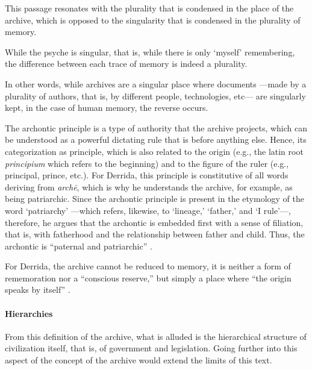 This passage resonates with the plurality that is condensed in the place of the archive, which is opposed to the singularity that is condensed in the plurality of memory. 

While the psyche is singular, that is, while there is only `myself' remembering, the difference between each trace of memory is indeed a plurality. 


In other words, while archives are a singular place where documents ---made by a plurality of authors, that is, by different people, technologies, etc--- are singularly kept, in the case of human memory, the reverse occurs. 


The archontic principle is a type of authority that the archive projects, which can be understood as a powerful dictating rule that is before anything else. Hence, its categorization as principle, which is also related to the origin (e.g., the latin root \textit{principium} which refers to the beginning) and to the figure of the ruler (e.g., principal, prince, etc.). For Derrida, this principle is constitutive of all words deriving from \textit{archē}, which is why he understands the archive, for example, as being patriarchic. Since the archontic principle is present in the etymology of the word `patriarchy' ---which refers, likewise, to `lineage,' `father,' and `I rule'---, therefore, he argues that the archontic is embedded first with a sense of filiation, that is, with fatherhood and the relationship between father and child. Thus, the archontic is ``paternal and patriarchic'' \parencite[60]{Der95:Arc}. 


For Derrida, the archive cannot be reduced to memory, it is neither a form of rememoration nor a ``conscious reserve,'' but simply a place where ``the origin speaks by itself'' \parencite[60]{Der95:Arc}. 







	\paragraph{Hierarchies}


	From this definition of the archive, what is alluded is the hierarchical structure of civilization itself, that is, of government and legislation. Going further into this aspect of the concept of the archive would extend the limits of this text. 

